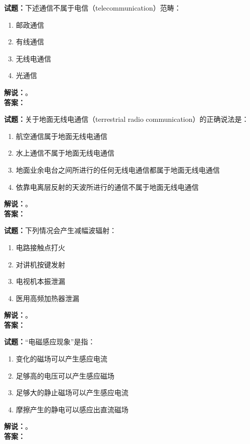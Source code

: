 \documentclass{ctexbook}
\begin{document}
\bigskip

\noindent\textbf{试题：}下述通信不属于电信（telecommunication）范畴：
\begin{enumerate}[leftmargin=3em]
  \item 邮政通信
  \item 有线通信
  \item 无线电通信
  \item 光通信
\end{enumerate}
\noindent\textbf{解说：}\textbf{}。\\\noindent\textbf{答案：}

\bigskip

\noindent\textbf{试题：}关于地面无线电通信（terrestrial radio communication）的正确说法是：
\begin{enumerate}[leftmargin=3em]
  \item 航空通信属于地面无线电通信
  \item 水上通信不属于地面无线电通信
  \item 地面业余电台之间所进行的任何无线电通信都属于地面无线电通信
  \item 依靠电离层反射的天波所进行的通信不属于地面无线电通信
\end{enumerate}
\noindent\textbf{解说：}\textbf{}。\\\noindent\textbf{答案：}

\bigskip

\noindent\textbf{试题：}下列情况会产生减幅波辐射：
\begin{enumerate}[leftmargin=3em]
  \item 电路接触点打火
  \item 对讲机按键发射
  \item 电视机本振泄漏
  \item 医用高频加热器泄漏
\end{enumerate}
\noindent\textbf{解说：}\textbf{}。\\\noindent\textbf{答案：}

\bigskip

\noindent\textbf{试题：}“电磁感应现象”是指：
\begin{enumerate}[leftmargin=3em]
  \item 变化的磁场可以产生感应电流
  \item 足够高的电压可以产生感应磁场
  \item 足够大的静止磁场可以产生感应电流
  \item 摩擦产生的静电可以感应出直流磁场
\end{enumerate}
\noindent\textbf{解说：}\textbf{}。\\\noindent\textbf{答案：}
\end{document}
